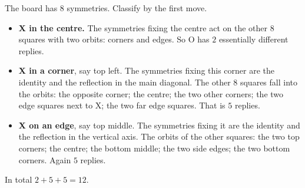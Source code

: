 The board has $8$ symmetries. Classify by the first move.
\begin{itemize}
\item \textbf{X in the centre.} The symmetries fixing the centre act on the other $8$ squares with two orbits: corners and edges. So O has $2$ essentially different replies.
\item \textbf{X in a corner}, say top left. The symmetries fixing this corner are the identity and the reflection in the main diagonal. The other $8$ squares fall into the orbits: the opposite corner; the centre; the two other corners; the two edge squares next to X; the two far edge squares. That is $5$ replies.
\item \textbf{X on an edge}, say top middle. The symmetries fixing it are the identity and the reflection in the vertical axis. The orbits of the other squares: the two top corners; the centre; the bottom middle; the two side edges; the two bottom corners. Again $5$ replies.
\end{itemize}
In total $2+5+5=\boxed{12}$.
